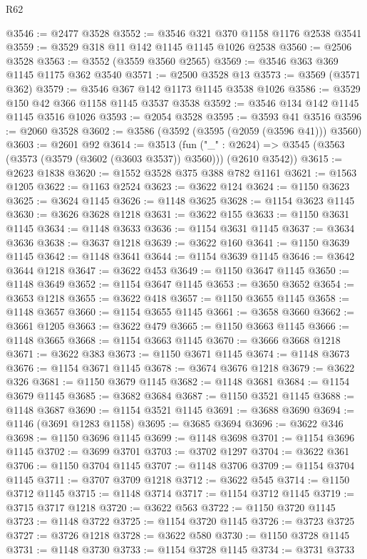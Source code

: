 \begin{lexlean}{R62}
\begin{coremodule}
@3546 := @2477 @3528
@3552 := @3546 @321 @370 @1158 @1176 @2538 @3541
@3559 := @3529 @318 @11 @142 @1145 @1145 @1026 @2538
@3560 := @2506 @3528
@3563 := @3552 (@3559 @3560 @2565)
@3569 := @3546 @363 @369 @1145 @1175 @362 @3540
@3571 := @2500 @3528 @13
@3573 := @3569 (@3571 @362)
@3579 := @3546 @367 @142 @1173 @1145 @3538 @1026
@3586 := @3529 @150 @42 @366 @1158 @1145 @3537 @3538
@3592 := @3546 @134 @142 @1145 @1145 @3516 @1026
@3593 := @2054 @3528
@3595 := @3593 @41 @3516
@3596 := @2060 @3528
@3602 := @3586 (@3592 (@3595 (@2059 (@3596 @41))) @3560)
@3603 := @2601 @92
@3614 := @3513
    (fun ("_" : @2624) => @3545 (@3563 (@3573 (@3579 (@3602 (@3603 @3537)) @3560))) (@2610 @3542))
@3615 := @2623 @1838
@3620 := @1552 @3528 @375 @388 @782 @1161
@3621 := @1563 @1205
@3622 := @1163 @2524
@3623 := @3622 @124
@3624 := @1150 @3623
@3625 := @3624 @1145
@3626 := @1148 @3625
@3628 := @1154 @3623 @1145
@3630 := @3626 @3628 @1218
@3631 := @3622 @155
@3633 := @1150 @3631 @1145
@3634 := @1148 @3633
@3636 := @1154 @3631 @1145
@3637 := @3634 @3636
@3638 := @3637 @1218
@3639 := @3622 @160
@3641 := @1150 @3639 @1145
@3642 := @1148 @3641
@3644 := @1154 @3639 @1145
@3646 := @3642 @3644 @1218
@3647 := @3622 @453
@3649 := @1150 @3647 @1145
@3650 := @1148 @3649
@3652 := @1154 @3647 @1145
@3653 := @3650 @3652
@3654 := @3653 @1218
@3655 := @3622 @418
@3657 := @1150 @3655 @1145
@3658 := @1148 @3657
@3660 := @1154 @3655 @1145
@3661 := @3658 @3660
@3662 := @3661 @1205
@3663 := @3622 @479
@3665 := @1150 @3663 @1145
@3666 := @1148 @3665
@3668 := @1154 @3663 @1145
@3670 := @3666 @3668 @1218
@3671 := @3622 @383
@3673 := @1150 @3671 @1145
@3674 := @1148 @3673
@3676 := @1154 @3671 @1145
@3678 := @3674 @3676 @1218
@3679 := @3622 @326
@3681 := @1150 @3679 @1145
@3682 := @1148 @3681
@3684 := @1154 @3679 @1145
@3685 := @3682 @3684
@3687 := @1150 @3521 @1145
@3688 := @1148 @3687
@3690 := @1154 @3521 @1145
@3691 := @3688 @3690
@3694 := @1146 (@3691 @1283 @1158)
@3695 := @3685 @3694
@3696 := @3622 @346
@3698 := @1150 @3696 @1145
@3699 := @1148 @3698
@3701 := @1154 @3696 @1145
@3702 := @3699 @3701
@3703 := @3702 @1297
@3704 := @3622 @361
@3706 := @1150 @3704 @1145
@3707 := @1148 @3706
@3709 := @1154 @3704 @1145
@3711 := @3707 @3709 @1218
@3712 := @3622 @545
@3714 := @1150 @3712 @1145
@3715 := @1148 @3714
@3717 := @1154 @3712 @1145
@3719 := @3715 @3717 @1218
@3720 := @3622 @563
@3722 := @1150 @3720 @1145
@3723 := @1148 @3722
@3725 := @1154 @3720 @1145
@3726 := @3723 @3725
@3727 := @3726 @1218
@3728 := @3622 @580
@3730 := @1150 @3728 @1145
@3731 := @1148 @3730
@3733 := @1154 @3728 @1145
@3734 := @3731 @3733

\end{coremodule}
\end{lexlean}

